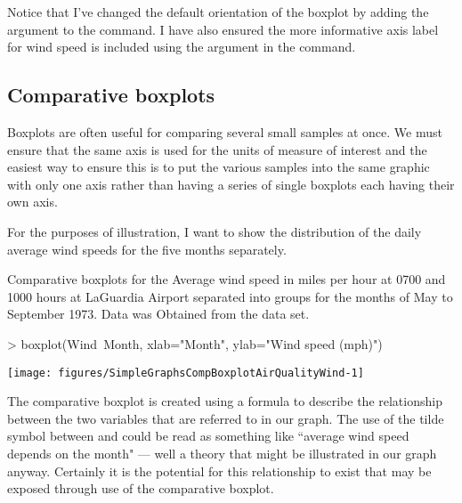Notice that I've changed the default orientation of the boxplot by adding the argument  to the  command. I have also ensured the more informative axis label for wind speed is included using the  argument in the command. 
 
\subsection{Comparative boxplots} 
 
Boxplots are often useful for comparing several small samples at once. We must ensure that the same axis is used for the units of measure of interest and the easiest way to ensure this is to put the various samples into the same graphic with only one axis rather than having a series of single boxplots each having their own axis. 
 
For the purposes of illustration, I want to show the distribution of the daily average wind speeds for the five months separately.  
\begin{exhibit} 
\begin{center} 
\caption{Comparative boxplots for the Average wind speed in miles per hour at 0700 and 1000 hours at LaGuardia Airport separated into groups for the months of May to September 1973. Data was Obtained from the  data set.} 
\label{AirQualityCompBoxplotWindMonth} 

\begin{Schunk}
\begin{Sinput}
> boxplot(Wind~Month, xlab="Month", ylab="Wind speed (mph)") 
\end{Sinput}
\end{Schunk}
\texttt{[image: figures/SimpleGraphsCompBoxplotAirQualityWind-1]} 



\end{center} 
\end{exhibit} 
The comparative boxplot is created using a formula to describe the relationship between the two variables that are referred to in our graph. The use of the tilde symbol between  and  could be read as something like ``average wind speed depends on the month" --- well a theory that might be illustrated in our graph anyway. Certainly it is the potential for this relationship to exist that may be exposed through use of the comparative boxplot. 
 
